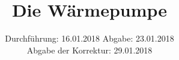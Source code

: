 

\subject{Versuch 206}
\title{Die Wärmepumpe}
\date{
  Durchführung: 16.01.2018
  \hspace{3em}
  Abgabe: 23.01.2018 \\
  Abgabe der Korrektur: 29.01.2018
}


    \maketitle
    \thispagestyle{empty}
    \tableofcontents
    \newpage
    
    
    \newpage
    
    \newpage
    
    
    \printbibliography{}
    \newpage
    

